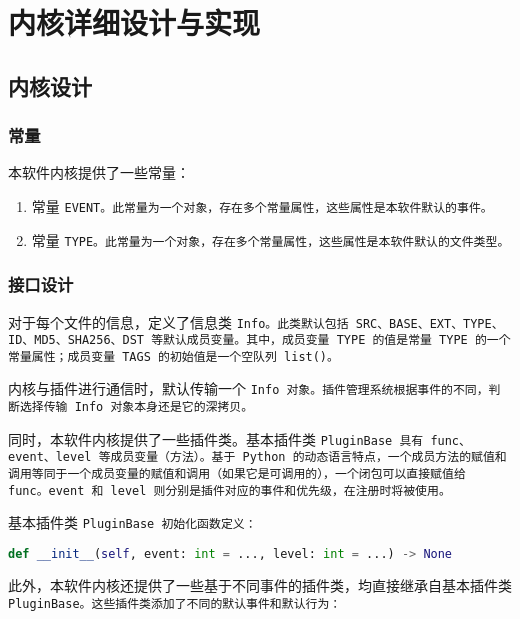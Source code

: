 \chapter{内核详细设计与实现}

\section{内核设计}

\subsection{常量}

本软件内核提供了一些常量：

\begin{enumerate}
    \item 常量 \tt{EVENT}。此常量为一个对象，存在多个常量属性，这些属性是本软件默认的事件。
    \item 常量 \tt{TYPE}。此常量为一个对象，存在多个常量属性，这些属性是本软件默认的文件类型。
\end{enumerate}

\subsection{接口设计}

对于每个文件的信息，定义了信息类 \tt{Info}。此类默认包括 \tt{SRC}、\tt{BASE}、\tt{EXT}、\tt{TYPE}、\tt{ID}、\tt{MD5}、\tt{SHA256}、\tt{DST} 等默认成员变量。其中，成员变量 \tt{TYPE} 的值是常量 \tt{TYPE} 的一个常量属性；成员变量 \tt{TAGS} 的初始值是一个空队列 \tt{list()}。

内核与插件进行通信时，默认传输一个 \tt{Info} 对象。插件管理系统根据事件的不同，判断选择传输 \tt{Info} 对象本身还是它的深拷贝。

同时，本软件内核提供了一些插件类。基本插件类 \tt{PluginBase} 具有 \tt{func}、\tt{event}、\tt{level} 等成员变量（方法）。基于 Python 的动态语言特点，一个成员方法的赋值和调用等同于一个成员变量的赋值和调用（如果它是可调用的），一个闭包可以直接赋值给 \tt{func}。\tt{event} 和 \tt{level} 则分别是插件对应的事件和优先级，在注册时将被使用。

基本插件类 \tt{PluginBase} 初始化函数定义：

\begin{lstlisting}[language=Python]
def __init__(self, event: int = ..., level: int = ...) -> None
\end{lstlisting}

此外，本软件内核还提供了一些基于不同事件的插件类，均直接继承自基本插件类 \tt{PluginBase}。这些插件类添加了不同的默认事件和默认行为：

